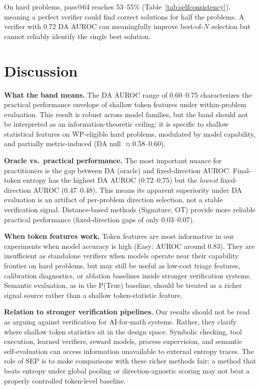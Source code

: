 \documentclass{article}
\begin{document}
On hard problems, pass@64 reaches 53--55\% (Table~\ref{tab:selfconsistency}), meaning a perfect verifier could find correct solutions for half the problems. A verifier with 0.72 DA AUROC can meaningfully improve best-of-$N$ selection but cannot reliably identify the single best solution.

\section{Discussion}
\label{sec:discussion}

\textbf{What the band means.} The DA AUROC range of 0.60--0.75 characterizes the practical performance envelope of shallow token features under within-problem evaluation. This result is robust across model families, but the band should not be interpreted as an information-theoretic ceiling: it is specific to shallow statistical features on WP-eligible hard problems, modulated by model capability, and partially metric-induced (DA null $\approx$0.58--0.60).

\textbf{Oracle vs.\ practical performance.} The most important nuance for practitioners is the gap between DA (oracle) and fixed-direction AUROC. Final-token entropy has the highest DA AUROC (0.72--0.75) but the \textit{lowest} fixed-direction AUROC (0.47--0.48). This means its apparent superiority under DA evaluation is an artifact of per-problem direction selection, not a stable verification signal. Distance-based methods (Signature, OT) provide more reliable practical performance (fixed-direction gaps of only 0.03--0.07).

\textbf{When token features work.} Token features are most informative in our experiments when model accuracy is high (Easy: AUROC around 0.83). They are insufficient as standalone verifiers when models operate near their capability frontier on hard problems, but may still be useful as low-cost triage features, calibration diagnostics, or ablation baselines inside stronger verification systems. Semantic evaluation, as in the P(True) baseline, should be treated as a richer signal source rather than a shallow token-statistic feature.

\textbf{Relation to stronger verification pipelines.} Our results should not be read as arguing against verification for AI-for-math systems. Rather, they clarify where shallow token statistics sit in the design space. Symbolic checking, tool execution, learned verifiers, reward models, process supervision, and semantic self-evaluation can access information unavailable to external entropy traces. The role of SEP is to make comparisons with these richer methods fair: a method that beats entropy under global pooling or direction-agnostic scoring may not beat a properly controlled token-level baseline.
\end{document}
